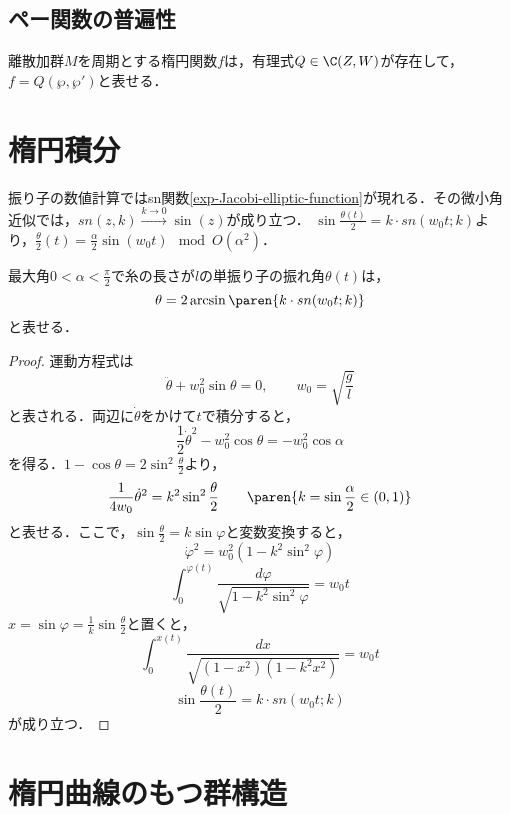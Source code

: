 \documentclass[uplatex, dvipdfmx]{jsreport}
\begin{document}
\subsection{ペー関数の普遍性}

\begin{theorem}[ペー関数の普遍性]\label{thm-universality-of-p}
    離散加群$M$を周期とする楕円関数$f$は，有理式$Q\in\C(Z,W)$が存在して，$f=Q(\wp,\wp')$と表せる．
\end{theorem}


\section{楕円積分}

\begin{tcolorbox}[colframe=ForestGreen, colback=ForestGreen!10!white,breakable,colbacktitle=ForestGreen!40!white,coltitle=black,fonttitle=\bfseries\sffamily,
title=]
    振り子の数値計算ではsn関数\ref{exp-Jacobi-elliptic-function}が現れる．その微小角近似では，$sn(z,k)\xrightarrow{k\to 0}\sin(z)$が成り立つ．
    $\sin\frac{\theta(t)}{2}=k\cdot sn(w_0t;k)$より，$\frac{\theta}{2}(t)=\frac{\alpha}{2}\sin(w_0t)\mod O(\alpha^2)$．
\end{tcolorbox}

\begin{proposition}
    最大角$0<\alpha<\frac{\pi}{2}$で糸の長さが$l$の単振り子の振れ角$\theta(t)$は，
    \[\theta=2\arcsin\paren{k\cdot sn(w_0t;k)}\]
    と表せる．
\end{proposition}
\begin{proof}
    運動方程式は
    \[\ddot{\theta}+w_0^2\sin\theta=0,\qquad w_0=\sqrt{\frac{g}{l}}\]
    と表される．両辺に$\dot{\theta}$をかけて$t$で積分すると，
    \[\frac{1}{2}\dot{\theta}^2-w_0^2\cos\theta=-w_0^2\cos\alpha\]
    を得る．$1-\cos\theta=2\sin^2\frac{\theta}{2}$より，
    \[\frac{1}{4w_0}\dot{\theta}^2=k^2\sin^2\frac{\theta}{2}\qquad\paren{k=\sin\frac{\alpha}{2}\in(0,1)}\]
    と表せる．ここで，$\sin\frac{\theta}{2}=k\sin\varphi$と変数変換すると，
    \[\dot{\varphi}^2=w_0^2(1-k^2\sin^2\varphi)\]
    \[\int^{\varphi(t)}_0\frac{d\varphi}{\sqrt{1-k^2\sin^2\varphi}}=w_0t\]
    $x=\sin\varphi=\frac{1}{k}\sin\frac{\theta}{2}$と置くと，
    \[\int^{x(t)}_0\frac{dx}{\sqrt{(1-x^2)(1-k^2x^2)}}=w_0t\]
    \[\sin\frac{\theta(t)}{2}=k\cdot sn(w_0t;k)\]
    が成り立つ．
\end{proof}

\section{楕円曲線のもつ群構造}
\end{document}

